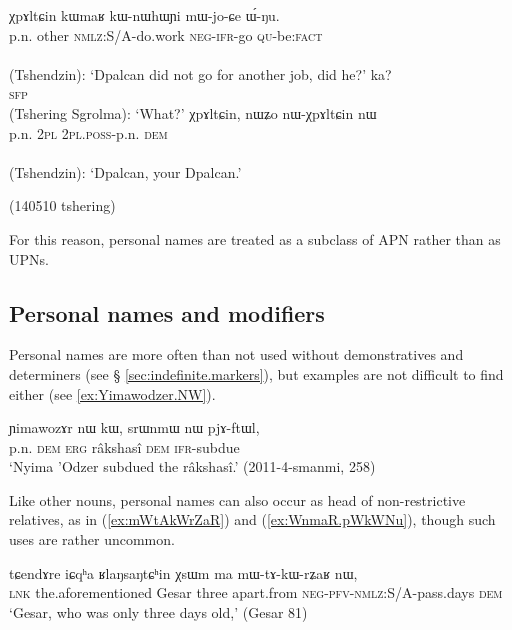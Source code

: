 \begin{exe}
\ex   
\begin{xlist}
\ex 
\gll χpɤltɕin kɯmaʁ kɯ-nɯhɯɲi mɯ-jo-ɕe ɯ́-ŋu. \\
p.n. other \textsc{nmlz}:S/A-do.work \textsc{neg}-\textsc{ifr}-go \textsc{qu}-be:\textsc{fact} \\
\\
\glt (Tshendzin): `Dpalcan did not go for another job, did he?'
\ex 
\gll ka? \\
\textsc{sfp} \\
\glt  (Tshering Sgrolma): `What?'
\ex  \label{ex:nWχpAltCin}
\gll χpɤltɕin, nɯʑo nɯ-χpɤltɕin nɯ \\
p.n. \textsc{2pl} \textsc{2pl}.\textsc{poss}-p.n. \textsc{dem} \\
\\
\glt (Tshendzin): `Dpalcan, your Dpalcan.'  
\end{xlist}
\glt  (140510 tshering)
\end{exe}

For this reason, personal names are treated as a subclass of APN rather than as UPNs.
 
\subsection{Personal names and modifiers} \label{sec:personal.names.modifiers}
Personal names are more often than not used without demonstratives and determiners (see § \ref{sec:indefinite.markers}), but examples are not difficult to find either (see \ref{ex:Yimawodzer.NW}).

\begin{exe}
\ex \label{ex:Yimawodzer.NW}
 \gll  ɲimawozɤr nɯ kɯ, srɯnmɯ nɯ pjɤ-ftɯl, \\
 p.n. \textsc{dem} \textsc{erg} râkshasî \textsc{dem} \textsc{ifr}-subdue \\
 \glt `Nyima 'Odzer subdued the râkshasî.' (2011-4-smanmi, 258)
\end{exe}

Like other nouns, personal names can also occur as head of non-restrictive relatives, as in  (\ref{ex:mWtAkWrZaR}) and (\ref{ex:WnmaR.pWkWNu}), though such uses are rather uncommon.

  \begin{exe}
\ex \label{ex:mWtAkWrZaR}
\gll  tɕendɤre 	iɕqʰa 	ʁlaŋsaŋtɕʰin 	χsɯm 	ma 	mɯ-tɤ-kɯ-rʑaʁ 	nɯ, \\
\textsc{lnk} the.aforementioned Gesar three apart.from \textsc{neg}-\textsc{pfv}-\textsc{nmlz}:S/A-pass.days \textsc{dem} \\
\glt `Gesar, who was only three days old,'  (Gesar 81)
\end{exe}

